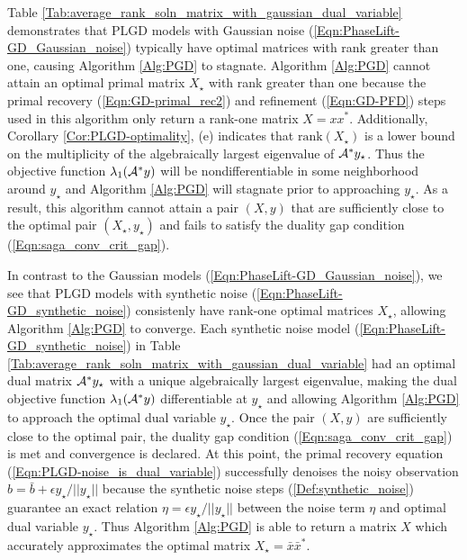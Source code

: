 Table \ref{Tab:average_rank_soln_matrix_with_gaussian_dual_variable} demonstrates that PLGD models with Gaussian noise (\ref{Eqn:PhaseLift-GD_Gaussian_noise}) typically have optimal matrices with rank greater than one, causing Algorithm \ref{Alg:PGD} to stagnate.  Algorithm \ref{Alg:PGD} cannot attain an optimal primal matrix $X_\star$ with rank greater than one because the primal recovery (\ref{Eqn:GD-primal_rec2}) and refinement (\ref{Eqn:GD-PFD}) steps used in this algorithm only return a rank-one matrix $X = xx^*$.  Additionally, Corollary \ref{Cor:PLGD-optimality}, (e) indicates that $\text{rank}(X_\star)$ is a lower bound on the multiplicity of the algebraically largest eigenvalue of ${\mathcal A}^*y_\star$.  Thus the objective function $\lambda_1({\mathcal A}^*y)$ will be nondifferentiable in some neighborhood around $y_\star$ and Algorithm \ref{Alg:PGD} will stagnate prior to approaching $y_\star$.  As a result, this algorithm cannot attain a pair $(X,y)$ that are sufficiently close to the optimal pair $(X_\star, y_\star)$ and fails to satisfy the duality gap condition (\ref{Eqn:saga_conv_crit_gap}).


In contrast to the Gaussian models (\ref{Eqn:PhaseLift-GD_Gaussian_noise}), we see that PLGD models with synthetic noise (\ref{Eqn:PhaseLift-GD_synthetic_noise}) consistenly have rank-one optimal matrices $X_\star$, allowing Algorithm \ref{Alg:PGD} to converge.  
Each synthetic noise model (\ref{Eqn:PhaseLift-GD_synthetic_noise}) in Table \ref{Tab:average_rank_soln_matrix_with_gaussian_dual_variable} had an optimal dual matrix ${\mathcal A}^*y_\star$ with a unique algebraically largest eigenvalue, making the dual objective function $\lambda_1({\mathcal A}^*y)$ differentiable at $y_\star$ and allowing Algorithm \ref{Alg:PGD} to approach the optimal dual variable $y_\star$.  
Once the pair $(X,y)$ are sufficiently close to the optimal pair, the duality gap condition (\ref{Eqn:saga_conv_crit_gap}) is met and convergence is declared.
At this point, the primal recovery equation (\ref{Eqn:PLGD-noise_is_dual_variable}) successfully denoises the noisy observation $b = \bar{b} + \epsilon y_\star / ||y_\star||$ because the synthetic noise steps (\ref{Def:synthetic_noise}) guarantee an exact relation $\eta = \epsilon y_\star / ||y_\star||$ between the noise term $\eta$ and optimal dual variable $y_\star$.
Thus Algorithm \ref{Alg:PGD} is able to return a matrix $X$ which accurately approximates the optimal matrix $X_\star = \bar{x}\bar{x}^*$.  










